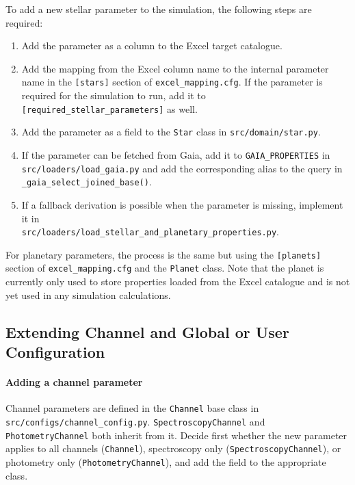 To add a new stellar parameter to the simulation, the following steps are required:

\begin{enumerate}
    \item Add the parameter as a column to the Excel target catalogue.
    \item Add the mapping from the Excel column name to the internal parameter name in the \texttt{[stars]} section of \texttt{excel\_mapping.cfg}. If the parameter is required for the simulation to run, add it to \\ \texttt{[required\_stellar\_parameters]} as well.
    \item Add the parameter as a field to the \texttt{Star} class in \texttt{src/domain/star.py}.
    \item If the parameter can be fetched from Gaia, add it to \texttt{GAIA\_PROPERTIES} in \texttt{src/loaders/load\_gaia.py} and add the corresponding alias to the query in \texttt{\_gaia\_select\_joined\_base()}.
    \item If a fallback derivation is possible when the parameter is missing, implement it in \\ \texttt{src/loaders/load\_stellar\_and\_planetary\_properties.py}.
\end{enumerate}

For planetary parameters, the process is the same but using the \texttt{[planets]} section of \texttt{excel\_mapping.cfg} and the \texttt{Planet} class. Note that the planet is currently only used to store properties loaded from the Excel catalogue and is not yet used in any simulation calculations.

\subsection{Extending Channel and Global or User Configuration}

\paragraph{Adding a channel parameter} Channel parameters are defined in the \texttt{Channel} base class in \texttt{src/configs\allowbreak/channel\_config.py}. \texttt{SpectroscopyChannel} and \texttt{PhotometryChannel} both inherit from it. Decide first whether the new parameter applies to all channels (\texttt{Channel}), spectroscopy only (\texttt{SpectroscopyChannel}), or photometry only (\texttt{PhotometryChannel}), and add the field to the appropriate class.


